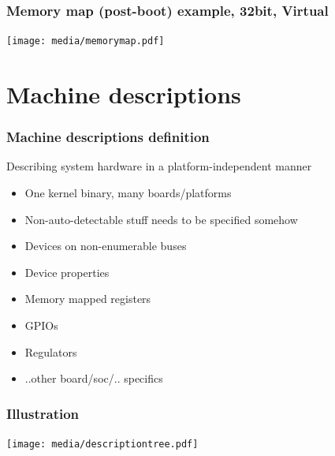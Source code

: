 \documentclass{beamer}
\begin{document}
\begin{frame}
\frametitle{Memory map (post-boot) example, 32bit, Virtual}
\begin{center}
\texttt{[image: media/memorymap.pdf]}
\end{center}
\end{frame}
\section{Machine descriptions}

\begin{frame}
\frametitle{Machine descriptions definition}
Describing system hardware in a platform-independent manner
\begin{itemize}
	\item One kernel binary, many boards/platforms
	\item Non-auto-detectable stuff needs to be specified somehow
	\item Devices on non-enumerable buses
	\item Device properties
	\item Memory mapped registers
	\item GPIOs
	\item Regulators
	\item ..other board/soc/.. specifics
\end{itemize}
\end{frame}

\begin{frame}
\frametitle{Illustration}
\begin{center}
\texttt{[image: media/descriptiontree.pdf]}
\end{center}
\end{frame}
\end{document}
